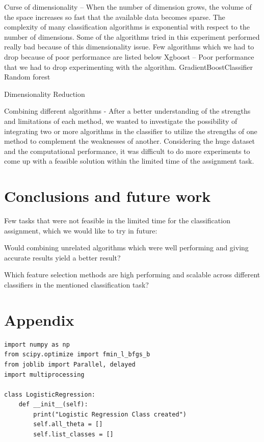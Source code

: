 \documentclass[letterpaper,10pt]{article}
\theoremstyle{mytheor}
\begin{document}
Curse of dimensionality – When the number of dimension grows, the volume of the space increases so fast that the available data becomes sparse. The complexity of many classification algorithms is exponential with respect to the number of dimensions. Some of the algorithms tried in this experiment performed really bad because of this dimensionality issue. Few algorithms which we had to drop because of poor performance are listed below
Xgboost – Poor performance that we had to drop experimenting with the algorithm.
GradientBoostClassifier
Random forest 

Dimensionality Reduction


Combining different algorithms - After a better understanding of the strengths and limitations of each method, we wanted to investigate the possibility of integrating two or more algorithms in the classifier to utilize the strengths of one method to complement the weaknesses of another. Considering the huge dataset and the computational performance, it was difficult to do more experiments to come up with a feasible solution within the limited time of the assignment task.


\section{Conclusions and future work}

Few tasks that were not feasible in the limited time for the classification assignment, which we would like to try in future:

Would combining unrelated algorithms which were well performing and giving accurate results yield a better result?

Which feature selection methods are high performing and scalable across different classifiers in the mentioned classification task? 


\nocite{wiki:fscore}
\nocite{wiki:pandr}
\nocite{wiki:stat} 
\nocite{wiki:curse}



\section{Appendix}
\begin{lstlisting}[label={list:first},caption=Class Definition]
import numpy as np
from scipy.optimize import fmin_l_bfgs_b
from joblib import Parallel, delayed
import multiprocessing

class LogisticRegression:
    def __init__(self):
        print("Logistic Regression Class created")
        self.all_theta = []
        self.list_classes = []
\end{lstlisting}
\end{document}
